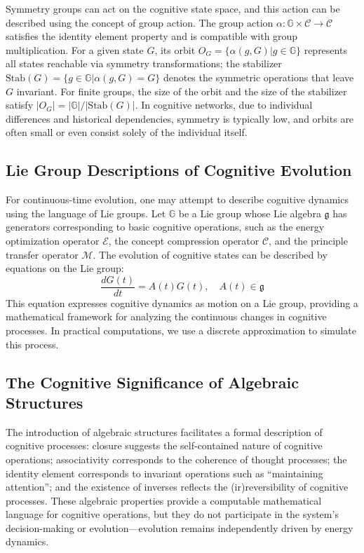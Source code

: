 \documentclass[10pt,onecolumn]{article}
\newcommand{\cognitivespace}{\mathcal{C}}
\newcommand{\cognitivegroup}{\mathbb{G}}
\newcommand{\energyoperator}{\mathcal{E}}
\newcommand{\compressionoperator}{\mathcal{C}}
\newcommand{\migrationoperator}{\mathcal{M}}
\begin{document}
Symmetry groups can act on the cognitive state space, and this action can be described using the concept of group action. The group action $\alpha: \cognitivegroup \times \cognitivespace \rightarrow \cognitivespace$ satisfies the identity element property and is compatible with group multiplication. For a given state $G$, its orbit $O_G = \{\alpha(g, G) | g \in \cognitivegroup\}$ represents all states reachable via symmetry transformations; the stabilizer $\text{Stab}(G) = \{g \in \cognitivegroup | \alpha(g, G) = G\}$ denotes the symmetric operations that leave $G$ invariant. For finite groups, the size of the orbit and the size of the stabilizer satisfy $|O_G| = |\cognitivegroup|/|\text{Stab}(G)|$. In cognitive networks, due to individual differences and historical dependencies, symmetry is typically low, and orbits are often small or even consist solely of the individual itself.

\subsection{Lie Group Descriptions of Cognitive Evolution}

For continuous-time evolution, one may attempt to describe cognitive dynamics using the language of Lie groups. Let $\cognitivegroup$ be a Lie group whose Lie algebra $\mathfrak{g}$ has generators corresponding to basic cognitive operations, such as the energy optimization operator $\energyoperator$, the concept compression operator $\compressionoperator$, and the principle transfer operator $\migrationoperator$. The evolution of cognitive states can be described by equations on the Lie group:
\begin{equation}
\frac{dG(t)}{dt} = A(t)G(t), \quad A(t) \in \mathfrak{g}
\end{equation}
This equation expresses cognitive dynamics as motion on a Lie group, providing a mathematical framework for analyzing the continuous changes in cognitive processes. In practical computations, we use a discrete approximation to simulate this process.

\subsection{The Cognitive Significance of Algebraic Structures}

The introduction of algebraic structures facilitates a formal description of cognitive processes: closure suggests the self-contained nature of cognitive operations; associativity corresponds to the coherence of thought processes; the identity element corresponds to invariant operations such as “maintaining attention”; and the existence of inverses reflects the (ir)reversibility of cognitive processes. These algebraic properties provide a computable mathematical language for cognitive operations, but they do not participate in the system’s decision-making or evolution—evolution remains independently driven by energy dynamics.
\end{document}
